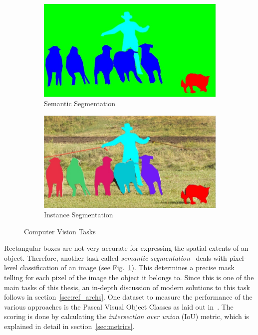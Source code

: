 \begin{figure}
    \begin{subfigure}{\VisionTasksImageWidth}
        \includegraphics[width=\textwidth]{images/vision_task_3}
        \caption{Semantic Segmentation}
        \label{fig:cv_task_semseg}
    \end{subfigure}
    \hspace{5mm}
    \begin{subfigure}{\VisionTasksImageWidth}
        \includegraphics[width=\textwidth]{images/vision_task_4}
        \caption{Instance Segmentation}
        \label{fig:cv_task_inseg}
    \end{subfigure}

    \caption[Computer Vision Tasks]{Computer Vision Tasks~\cite{coco15}}
    \label{fig:cv_tasks}
\end{figure}

Rectangular boxes are not very accurate for expressing the spatial extents of an object. Therefore, another task called \emph{semantic segmentation}~\cite{weakseg15} deals with pixel-level classification of an image (see Fig.~\ref{fig:cv_task_semseg}). This determines a precise mask telling for each pixel of the image the object it belongs to. Since this is one of the main tasks of this thesis, an in-depth discussion of modern solutions to this task follows in section~\ref{sec:ref_archs}. One dataset to measure the performance of the various approaches is the Pascal Visual Object Classes as laid out in~\cite{pascal_voc15}. The scoring is done by calculating the \emph{intersection over union} (IoU) metric, which is explained in detail in section~\ref{sec:metrics}.

